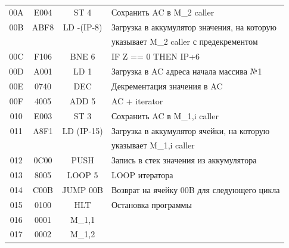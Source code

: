 \begin{center}
\begin{tabular}{|c|c|c|l|}
        00A                   & E004                  & ST 4               & Сохранить AC в M_{2} caller                       \\
        00B                   & ABF8                  & LD -(IP-8)         & Загрузка в аккумулятор значения, на которую       \\
        &                     &                       & указывает M_2 caller с предекрементом             \\
        00C                   & F106                  & BNE 6              & IF Z == 0 THEN IP+6                               \\
        00D                   & A001                  & LD 1               & Загрузка в AC адреса начала массива №1            \\
        00E                   & 0740                  & DEC                & Декрементация значения в AC                       \\
        00F                   & 4005                  & ADD 5              & AC + iterator                                     \\
        010                   & E003                  & ST 3               & Сохранить AC в M_{1,i} caller                     \\
        011                   & A8F1                  & LD (IP-15)         & Загрузка в аккумулятор ячейки, на которую         \\
        &                     &                       & указывает M_{1,i} caller                          \\
        012                   & 0C00                  & PUSH               & Запись в стек значения из аккумулятора            \\
        013                   & 8005                  & LOOP 5             & LOOP итератора                                    \\
        014                   & C00B                  & JUMP 00B           & Возврат на ячейку 00B для следующего цикла        \\
        015                   & 0100                  & HLT                & Остановка программы                               \\
        \hline
        016                   & 0001                  & M_{1,1}            &                                                   \\
        017                   & 0002                  & M_{1,2}            &                                                   \\

\end{tabular}
\end{center}
